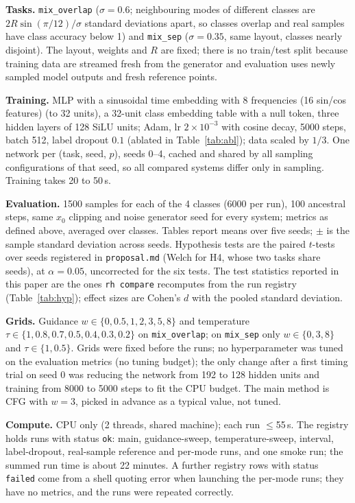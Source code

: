 \textbf{Tasks.} \texttt{mix\_overlap} ($\sigma=0.6$; neighbouring modes of different classes are $2R\sin(\pi/12)/\sigma$ standard deviations apart, so classes overlap and real samples have class accuracy below 1) and \texttt{mix\_sep} ($\sigma=0.35$, same layout, classes nearly disjoint). The layout, weights and $R$ are fixed; there is no train/test split because training data are streamed fresh from the generator and evaluation uses newly sampled model outputs and fresh reference points.

\textbf{Training.} MLP with a sinusoidal time embedding with 8 frequencies (16 sin/cos features) (to 32 units), a 32-unit class embedding table with a null token, three hidden layers of 128 SiLU units; Adam, lr $2\times10^{-3}$ with cosine decay, 5000 steps, batch 512, label dropout $0.1$ (ablated in Table~\ref{tab:abl}); data scaled by $1/3$. One network per (task, seed, $p$), seeds 0--4, cached and shared by all sampling configurations of that seed, so all compared systems differ only in sampling. Training takes 20 to 50\,s.

\textbf{Evaluation.} 1500 samples for each of the 4 classes (6000 per run), 100 ancestral steps, same $x_0$ clipping and noise generator seed for every system; metrics as defined above, averaged over classes. Tables report means over five seeds; $\pm$ is the sample standard deviation across seeds. Hypothesis tests are the paired $t$-tests over seeds registered in \texttt{proposal.md} (Welch for H4, whose two tasks share seeds), at $\alpha=0.05$, uncorrected for the six tests. The test statistics reported in this paper are the ones \texttt{rh compare} recomputes from the run registry (Table~\ref{tab:hyp}); effect sizes are Cohen's $d$ with the pooled standard deviation.

\textbf{Grids.} Guidance $w\in\{0,0.5,1,2,3,5,8\}$ and temperature $\tau\in\{1,0.8,0.7,0.5,0.4,0.3,0.2\}$ on \texttt{mix\_overlap}; on \texttt{mix\_sep} only $w\in\{0,3,8\}$ and $\tau\in\{1,0.5\}$. Grids were fixed before the runs; no hyperparameter was tuned on the evaluation metrics (no tuning budget); the only change after a first timing trial on seed 0 was reducing the network from 192 to 128 hidden units and training from 8000 to 5000 steps to fit the CPU budget. The main method is CFG with $w=3$, picked in advance as a typical value, not tuned.

\textbf{Compute.} CPU only (2 threads, shared machine); each run $\le$55\,s. The registry holds  runs with status \texttt{ok}:  main,  guidance-sweep,  temperature-sweep,  interval,  label-dropout,  real-sample reference and  per-mode runs, and one smoke run; the summed run time is about 22 minutes. A further  registry rows with status \texttt{failed} come from a shell quoting error when launching the per-mode runs; they have no metrics, and the runs were repeated correctly.
